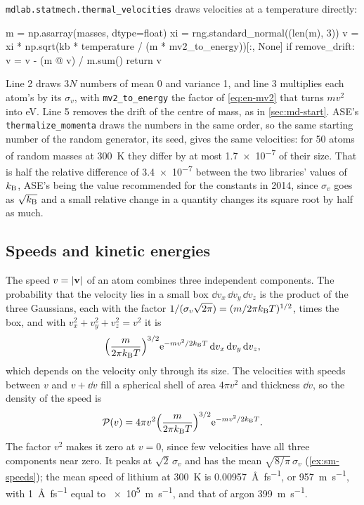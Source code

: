 \texttt{mdlab.statmech.thermal\_velocities} draws velocities at a
temperature directly:

\begin{code}
    m = np.asarray(masses, dtype=float)
    xi = rng.standard_normal((len(m), 3))
    v = xi * np.sqrt(kb * temperature / (m * mv2_to_energy))[:, None]
    if remove_drift:
        v = v - (m @ v) / m.sum()
    return v
\end{code}

\noindent Line 2 draws $3N$ numbers of mean 0 and variance 1, and line 3
multiplies each atom's by its $\sigma_v$, with \texttt{mv2\_to\_energy}
the factor of \cref{eq:en-mv2} that turns $mv^2$ into
\si{\electronvolt}. Line 5 removes the drift of the centre of mass, as in
\cref{sec:md-start}. ASE's \texttt{thermalize\_momenta} draws the numbers
in the same order, so the same starting number of the random generator,
its seed, gives the same velocities: for 50
atoms of random masses at \SI{300}{\kelvin} they differ by at most
\num{1.7e-7} of their size. That is half the relative difference of
\num{3.4e-7} between the two libraries' values of $k_{\mathrm{B}}$, ASE's being the
value recommended for the constants in 2014, since $\sigma_v$ goes as
$\sqrt{k_{\mathrm{B}}}$ and a small relative change in a quantity changes its square
root by half as much.

\subsection*{Speeds and kinetic energies}

The speed $v = \lvert\bm{\mathrm{v}}\rvert$ of an atom combines three independent
components. The probability that the velocity lies in a small box $\dd
v_x\,\dd v_y\,\dd v_z$ is the product of the three Gaussians, each with the
factor $1/(\sigma_v\sqrt{2\pi}) = (m/2\pi k_{\mathrm{B}} T)^{1/2}$, times the box, and
with $v_x^2 + v_y^2 + v_z^2 = v^2$ it is
\begin{equation*}
   \Bigl(\frac{m}{2\pi k_{\mathrm{B}} T}\Bigr)^{3/2}\mathrm{e}^{-mv^2/2k_{\mathrm{B}} T}\,
   \mathrm{d} v_x\,\mathrm{d} v_y\,\mathrm{d} v_z ,
\end{equation*}
which depends on the velocity only through its size. The velocities with
speeds between $v$ and $v + \dd v$ fill a spherical shell of area $4\pi
v^2$ and thickness $\dd v$, so the density of the speed is
\begin{equation}
   \mathcal{P}(v) = 4\pi v^2\Bigl(\frac{m}{2\pi k_{\mathrm{B}} T}\Bigr)^{3/2}
   \mathrm{e}^{-mv^2/2k_{\mathrm{B}} T} .
   \label{eq:sm-speed}
\end{equation}
The factor $v^2$ makes it zero at $v = 0$, since few velocities have all
three components near zero. It peaks at $\sqrt2\,\sigma_v$ and has the
mean $\sqrt{8/\pi}\,\sigma_v$ (\cref{ex:sm-speeds}); the mean speed of
lithium at \SI{300}{\kelvin} is \SI{0.00957}{\angstrom\per\femto\second},
or \SI{957}{\metre\per\second}, with \SI{1}{\angstrom\per\femto\second}
equal to \SI{e5}{\metre\per\second}, and that of argon
\SI{399}{\metre\per\second}.

